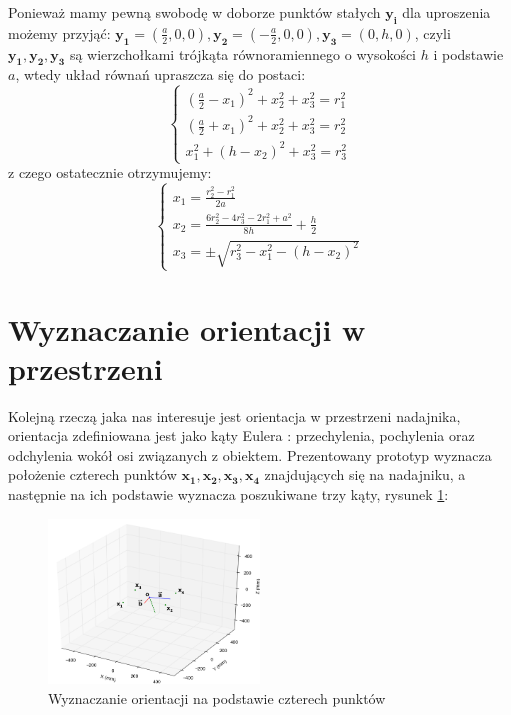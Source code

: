 Ponieważ mamy pewną swobodę w doborze punktów stałych $\boldsymbol{y_i}$ dla uproszenia możemy przyjąć:
$\boldsymbol{y_1}=(\frac{a}{2},0,0), \boldsymbol{y_2}=(-\frac{a}{2},0,0), \boldsymbol{y_3}=(0,h,0)$, czyli $\boldsymbol{y_1}, \boldsymbol{y_2}, \boldsymbol{y_3}$ są wierzchołkami
trójkąta równoramiennego o wysokości $h$ i podstawie $a$, wtedy układ równań upraszcza
się do postaci:
\[
 \begin{cases}
     (\frac{a}{2}-x_1)^2 + x_2^2 + x_3^2 = r_1^2
 \\  (\frac{a}{2}+x_1)^2 + x_2^2 + x_3^2 = r_2^2
 \\  x_1^2 + (h-x_2)^2 + x_3^2 = r_3^2
 \end{cases}
\]
z czego ostatecznie otrzymujemy:
\[
 \begin{cases}
     x_1 = \frac{r_2^2 - r_1^2}{2a}
 \\  x_2 = \frac{6r_2^2 - 4r_3^2 - 2r_1^2 + a^2}{8h}  + \frac{h}{2}
 \\  x_3 = \pm \sqrt{r_3^2-x_1^2-(h-x_2)^2}
 \end{cases}
\]


\section{Wyznaczanie orientacji w przestrzeni}


Kolejną rzeczą jaka nas interesuje jest orientacja w przestrzeni nadajnika,
orientacja zdefiniowana jest jako kąty Eulera \cite{bib:katyEulera}: przechylenia, 
pochylenia oraz odchylenia wokół osi związanych z obiektem.
Prezentowany prototyp wyznacza położenie czterech punktów $\boldsymbol{x_1, x_2, x_3, x_4}$ znajdujących się
na nadajniku, a następnie na ich podstawie wyznacza poszukiwane trzy kąty, rysunek \ref{fig:orientacja}:

 \begin{figure}[H]
    \centering
    \includegraphics[width=0.5\textwidth, trim= 0mm 0mm 0mm 0mm,clip]{orientacja}
    \caption{Wyznaczanie orientacji na podstawie czterech punktów}
    \label{fig:orientacja}
\end{figure}

